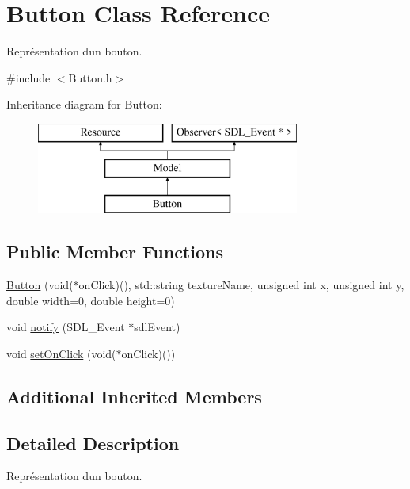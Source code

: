 \hypertarget{class_button}{}\section{Button Class Reference}
\label{class_button}


Représentation d\textquotesingle{}un bouton.  




{\ttfamily \#include $<$Button.\+h$>$}

Inheritance diagram for Button\+:\begin{figure}[H]
\begin{center}
\leavevmode
\includegraphics[height=3.000000cm]{class_button}
\end{center}
\end{figure}
\subsection*{Public Member Functions}
\begin{DoxyCompactItemize}
\item 
\hyperlink{class_button_a6873b27a9ded45b8b3c4d76efb34a5ca}{Button} (void($\ast$on\+Click)(), std\+::string texture\+Name, unsigned int x, unsigned int y, double width=0, double height=0)
\item 
void \hyperlink{class_button_a356536921e929a79edc11754e08ac405}{notify} (S\+D\+L\+\_\+\+Event $\ast$sdl\+Event)
\item 
void \hyperlink{class_button_aaf6bcd2cee8cceb7c7b28663f326b86a}{set\+On\+Click} (void($\ast$on\+Click)())
\end{DoxyCompactItemize}
\subsection*{Additional Inherited Members}


\subsection{Detailed Description}
Représentation d\textquotesingle{}un bouton. 


